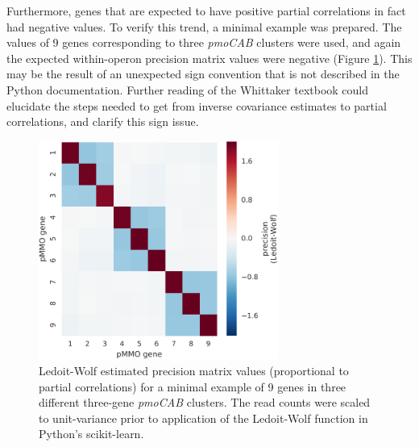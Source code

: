 Furthermore, genes that are expected to have positive partial correlations in fact had negative values.
To verify this trend, a minimal example was prepared.
The values of 9 genes corresponding to three \textit{pmoCAB} clusters were used, and again the expected within-operon precision matrix values were negative (Figure \ref{fig:pcor_pmocab}).
This may be the result of an unexpected sign convention that is not described in the Python documentation.
Further reading of the Whittaker textbook \cite{whittaker2009} could elucidate the steps needed to get from inverse covariance estimates to partial correlations, and clarify this sign issue.

\begin{figure}[H]
\centering
    \includegraphics[width=0.7\textwidth]{./tex/chapter3/figures/17045_LedoitWolf_results_on_9_pmo_genes--uncentered.pdf}
    \begin{singlespace}
    \caption[Partial correlation demo: three \textit{pmoCAB} clusters]{
        Ledoit-Wolf estimated precision matrix values (proportional to partial correlations) for a minimal example of 9 genes in three different three-gene \textit{pmoCAB} clusters.
        The read counts were scaled to unit-variance prior to application of the Ledoit-Wolf function in Python's scikit-learn.
        }
    \label{fig:pcor_pmocab}
    \end{singlespace}
\end{figure}


